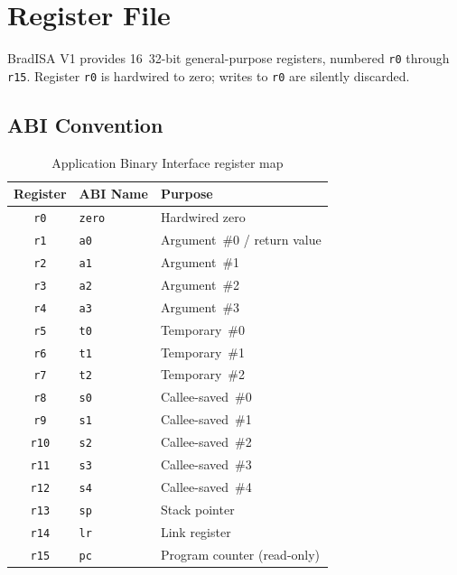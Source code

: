 \documentclass[11pt,a4paper]{article}
\begin{document}
\newpage

\section{Register File}

BradISA V1 provides 16~32-bit general-purpose registers, numbered {\tt r0}
through {\tt r15}. Register {\tt r0} is hardwired to zero; writes to {\tt r0}
are silently discarded.

\subsection{ABI Convention}
\begin{table}[H]
\centering
\caption{Application Binary Interface register map}
\begin{tabular}{cll}
\toprule
Register & ABI Name  & Purpose \\
\midrule
{\tt r0}  & {\tt zero} & Hardwired zero \\
{\tt r1}  & {\tt a0}   & Argument~\#0 / return value \\
{\tt r2}  & {\tt a1}   & Argument~\#1 \\
{\tt r3}  & {\tt a2}   & Argument~\#2 \\
{\tt r4}  & {\tt a3}   & Argument~\#3 \\
{\tt r5}  & {\tt t0}   & Temporary~\#0 \\
{\tt r6}  & {\tt t1}   & Temporary~\#1 \\
{\tt r7}  & {\tt t2}   & Temporary~\#2 \\
{\tt r8}  & {\tt s0}   & Callee-saved~\#0 \\
{\tt r9}  & {\tt s1}   & Callee-saved~\#1 \\
{\tt r10} & {\tt s2}   & Callee-saved~\#2 \\
{\tt r11} & {\tt s3}   & Callee-saved~\#3 \\
{\tt r12} & {\tt s4}   & Callee-saved~\#4 \\
{\tt r13} & {\tt sp}   & Stack pointer \\
{\tt r14} & {\tt lr}   & Link register \\
{\tt r15} & {\tt pc}   & Program counter (read-only) \\
\bottomrule
\end{tabular}
\end{table}
\end{document}
